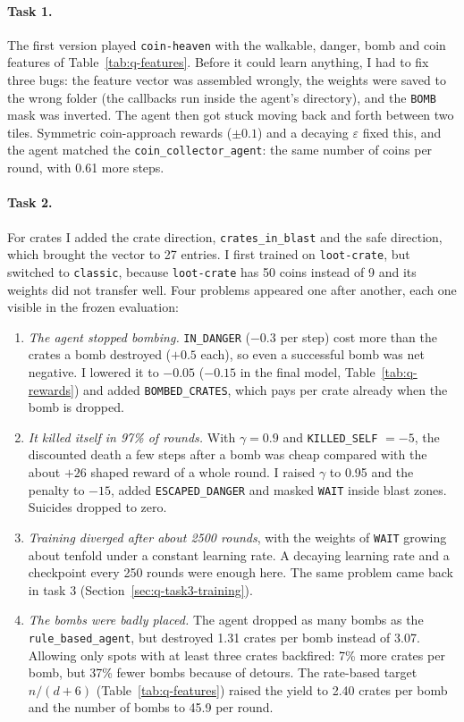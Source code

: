 \documentclass[11pt]{article}
\newcommand{\code}[1]{\texttt{#1}}
\begin{document}
\paragraph{Task 1.} The first version played \code{coin-heaven} with the walkable,
danger, bomb and coin features of Table~\ref{tab:q-features}. Before it could learn
anything, I had to fix three bugs: the feature vector was assembled wrongly, the weights
were saved to the wrong folder (the callbacks run inside the agent's directory), and the
\code{BOMB} mask was inverted. The agent then got stuck moving back and forth between two
tiles. Symmetric coin-approach rewards ($\pm 0.1$) and a decaying $\varepsilon$ fixed this,
and the agent matched the \code{coin\_collector\_agent}: the same number of coins per
round, with 0.61 more steps.
 
\paragraph{Task 2.} For crates I added the crate direction, \code{crates\_in\_blast} and
the safe direction, which brought the vector to 27 entries. I first trained on
\code{loot-crate}, but switched to \code{classic}, because \code{loot-crate} has 50 coins
instead of 9 and its weights did not transfer well. Four problems appeared one after
another, each one visible in the frozen evaluation:
\begin{enumerate}\setlength{\itemsep}{1pt}
  \item \emph{The agent stopped bombing.} \code{IN\_DANGER} ($-0.3$ per step) cost more
        than the crates a bomb destroyed ($+0.5$ each), so even a successful bomb was
        net negative. I lowered it to $-0.05$ ($-0.15$ in the final model,
        Table~\ref{tab:q-rewards}) and added \code{BOMBED\_CRATES}, which pays per crate
        already when the bomb is dropped.
  \item \emph{It killed itself in 97\% of rounds.} With $\gamma = 0.9$ and
        \code{KILLED\_SELF} $= -5$, the discounted death a few steps after a bomb was
        cheap compared with the about $+26$ shaped reward of a whole round. I raised $\gamma$
        to 0.95 and the penalty to $-15$, added \code{ESCAPED\_DANGER} and masked
        \code{WAIT} inside blast zones. Suicides dropped to zero.
  \item \emph{Training diverged after about 2500 rounds}, with the weights of
        \code{WAIT} growing about tenfold under a constant learning rate. A decaying
        learning rate and a checkpoint every 250 rounds were enough here. The same
        problem came back in task 3 (Section~\ref{sec:q-task3-training}).
  \item \emph{The bombs were badly placed.} The agent dropped as many bombs as the
        \code{rule\_based\_agent}, but destroyed 1.31 crates per bomb instead of 3.07.
        Allowing only spots with at least three crates backfired: 7\% more crates per
        bomb, but 37\% fewer bombs because of detours. The rate-based target
        $n/(d+6)$ (Table~\ref{tab:q-features}) raised the yield to 2.40 crates per bomb
        and the number of bombs to 45.9 per round.
\end{enumerate}
\end{document}
